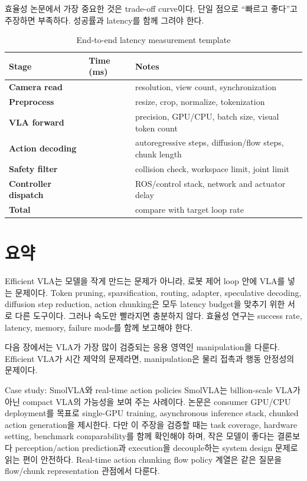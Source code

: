효율성 논문에서 가장 중요한 것은 trade-off curve이다. 단일 점으로 ``빠르고 좋다''고 주장하면 부족하다. 성공률과 latency를 함께 그려야 한다.

\begin{table}[t]
  \centering
  \caption{End-to-end latency measurement template}
  \label{tab:latency_measurement_template}
  \begin{tabularx}{\textwidth}{>{\bfseries}p{36mm}p{22mm}X}
    \toprule
    Stage & Time (ms) & Notes \\
    \midrule
    Camera read & & resolution, view count, synchronization \\
    Preprocess & & resize, crop, normalize, tokenization \\
    VLA forward & & precision, GPU/CPU, batch size, visual token count \\
    Action decoding & & autoregressive steps, diffusion/flow steps, chunk length \\
    Safety filter & & collision check, workspace limit, joint limit \\
    Controller dispatch & & ROS/control stack, network and actuator delay \\
    Total & & compare with target loop rate \\
    \bottomrule
  \end{tabularx}
\end{table}

\section{요약}

Efficient VLA는 모델을 작게 만드는 문제가 아니라, 로봇 제어 loop 안에 VLA를 넣는 문제이다. Token pruning, sparsification, routing, adapter, speculative decoding, diffusion step reduction, action chunking은 모두 latency budget을 맞추기 위한 서로 다른 도구이다. 그러나 속도만 빨라지면 충분하지 않다. 효율성 연구는 success rate, latency, memory, failure mode를 함께 보고해야 한다.

다음 장에서는 VLA가 가장 많이 검증되는 응용 영역인 manipulation을 다룬다. Efficient VLA가 시간 제약의 문제라면, manipulation은 물리 접촉과 행동 안정성의 문제이다.

\begin{casebox}{Case study: SmolVLA와 real-time action policies}
SmolVLA는 billion-scale VLA가 아닌 compact VLA의 가능성을 보여 주는 사례이다. 논문은 consumer GPU/CPU deployment를 목표로 single-GPU training, asynchronous inference stack, chunked action generation을 제시한다. 다만 이 주장을 검증할 때는 task coverage, hardware setting, benchmark comparability를 함께 확인해야 하며, 작은 모델이 좋다는 결론보다 perception/action prediction과 execution을 decouple하는 system design 문제로 읽는 편이 안전하다. Real-time action chunking flow policy 계열은 같은 질문을 flow/chunk representation 관점에서 다룬다.
\end{casebox}

